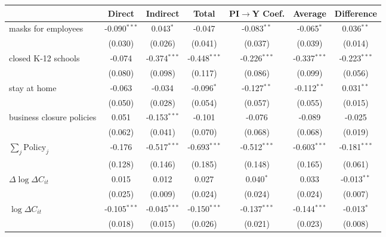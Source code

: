 
\begin{tabular}{lccccc|>{}c}
\toprule
  & Direct & Indirect & Total & PI$\to$Y Coef. & Average & Difference\\
\midrule
masks for employees & -0.090$^{***}$ & 0.043$^{*}$ & -0.047 & -0.083$^{**}$ & -0.065$^{*}$ & 0.036$^{**}$\\
 & (0.030) & (0.026) & (0.041) & (0.037) & (0.039) & (0.014)\\
closed K-12 schools & -0.074 & -0.374$^{***}$ & -0.448$^{***}$ & -0.226$^{***}$ & -0.337$^{***}$ & -0.223$^{***}$\\
 & (0.080) & (0.098) & (0.117) & (0.086) & (0.099) & (0.056)\\
stay at home & -0.063 & -0.034 & -0.096$^{*}$ & -0.127$^{**}$ & -0.112$^{**}$ & 0.031$^{**}$\\
 & (0.050) & (0.028) & (0.054) & (0.057) & (0.055) & (0.015)\\
business closure policies & 0.051 & -0.153$^{***}$ & -0.101 & -0.076 & -0.089 & -0.025\\
 & (0.062) & (0.041) & (0.070) & (0.068) & (0.068) & (0.019)\\
$\sum_j \mathrm{Policy}_j$ & -0.176 & -0.517$^{***}$ & -0.693$^{***}$ & -0.512$^{***}$ & -0.603$^{***}$ & -0.181$^{***}$\\
 & (0.128) & (0.146) & (0.185) & (0.148) & (0.165) & (0.061)\\
$\Delta \log \Delta C_{it}$ & 0.015 & 0.012 & 0.027 & 0.040$^{*}$ & 0.033 & -0.013$^{**}$\\
 & (0.025) & (0.009) & (0.024) & (0.024) & (0.024) & (0.007)\\
$\log \Delta C_{it}$ & -0.105$^{***}$ & -0.045$^{***}$ & -0.150$^{***}$ & -0.137$^{***}$ & -0.144$^{***}$ & -0.013$^{*}$\\
 & (0.018) & (0.015) & (0.026) & (0.021) & (0.023) & (0.008)\\
\bottomrule
\end{tabular}